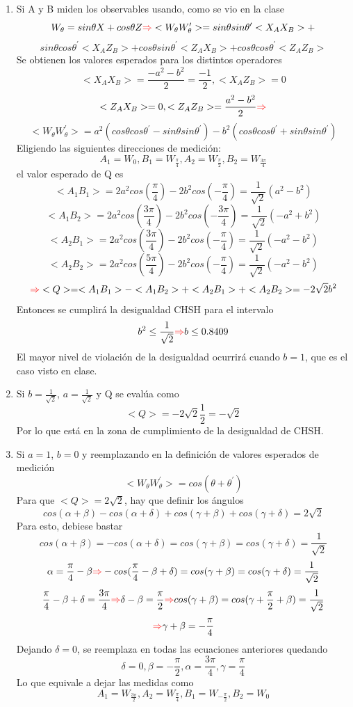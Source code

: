 \documentclass{book}
\begin{document}
\begin{enumerate}
    \item Si A y B miden los observables usando, como se vio en la clase $$ W_\theta=sin \theta X+cos\theta Z \textcolor{red}{\Rightarrow} <W_\theta W_\theta^\prime>= sin\theta sin\theta^\prime<X_AX_B>+$$ $$sin\theta cos\theta^\prime<X_AZ_B>+cos\theta sin\theta^\prime<Z_AX_B>+cos\theta cos\theta^\prime<Z_AZ_B>$$
    Se obtienen los valores esperados para los distintos operadores
    $$ <X_AX_B>=\frac{-a^2-b^2}{2}=\frac{-1}{2}, <X_AZ_B>=0$$
    $$ <Z_AX_B>=0, <Z_AZ_B>=\frac{a^2-b^2}{2}\textcolor{red}{\Rightarrow} $$ $$ <W_\theta W_\theta^\prime>=a^2(cos\theta cos\theta^\prime-sin\theta sin\theta^\prime)-b^2(cos\theta cos\theta^\prime+sin\theta sin\theta^\prime)$$ 
    $$ $$
    Eligiendo las siguientes direcciones de medición:
    $$ A_1=W_0, B_1=W_{\frac{\pi}{4}}, A_2=W_{\frac{\pi}{2}}, B_2=W_{\frac{3\pi}{4}}$$ el valor esperado de Q es 
    $$<A_1 B_1>=2a^2cos(\frac{\pi}{4})-2b^2cos(-\frac{\pi}{4})=\frac{1}{\sqrt{2}}(a^2-b^2)$$ 
    $$<A_1 B_2>=2a^2cos(\frac{3\pi}{4})-2b^2cos(-\frac{3\pi}{4})=\frac{1}{\sqrt{2}}(-a^2+b^2)$$ 
    $$<A_2 B_1>=2a^2 cos(\frac{3\pi}{4})-2b^2cos(-\frac{\pi}{4})=\frac{1}{\sqrt{2}}(-a^2-b^2)$$ 
    $$<A_2 B_2>=2a^2cos(\frac{5\pi}{4})-2b^2cos(-\frac{\pi}{4})=\frac{1}{\sqrt{2}}(-a^2-b^2)$$
    $$\textcolor{red}{\Rightarrow} <Q>=<A_1B_1>-<A_1B_2>+<A_2B_1>+<A_2B_2>=-2\sqrt{2}b^2$$ Entonces se cumplirá la desigualdad CHSH para el intervalo
    $$ b^2\leq \frac{1}{\sqrt{2}} \textcolor{red}{\Rightarrow} b\leq 0.8409$$
    El mayor nivel de violación de la desigualdad ocurrirá cuando $b=1$, que es el caso visto en clase.
    \item Si $b=\frac{1}{\sqrt{2}}$, $a=\frac{1}{\sqrt{2}}$ y Q se evalúa como
    $$ <Q>=-2\sqrt{2}\frac{1}{2}=-\sqrt{2}$$ 
    Por lo que está en la zona de cumplimiento de la desigualdad de CHSH.
    \item Si $a=1$, $b=0$ y reemplazando en la definición de valores esperados de medición
    $$ <W_\theta W_\theta^\prime>=cos(\theta+\theta^{\prime}) $$
    Para que $<Q>=2\sqrt{2}$, hay que definir los ángulos
    $$cos(\alpha+\beta)-cos(\alpha+\delta)+cos(\gamma+\beta)+cos(\gamma+\delta)=2\sqrt{2}$$ Para esto, debiese bastar
    $$ cos(\alpha+\beta)=-cos(\alpha+\delta)=cos(\gamma+\beta)=cos(\gamma+\delta)=\frac{1}{\sqrt{2}}$$ 
    $$ \alpha=\frac{\pi}{4}-\beta \textcolor{red}{\Rightarrow} -cos(\frac{\pi}{4}-\beta+\delta)=cos(\gamma+\beta)=cos(\gamma+\delta)=\frac{1}{\sqrt{2}}$$
    $$ \frac{\pi}{4}-\beta+\delta=\frac{3\pi}{4}\textcolor{red}{\Rightarrow} \delta-\beta=\frac{\pi}{2}\textcolor{red}{\Rightarrow} cos(\gamma+\beta)=cos(\gamma+\frac{\pi}{2}+\beta)=\frac{1}{\sqrt{2}}$$
    $$ \textcolor{red}{\Rightarrow} \gamma+\beta=-\frac{\pi}{4}$$
    Dejando $\delta=0$, se reemplaza en todas las ecuaciones anteriores quedando $$ \delta=0, \beta=-\frac{\pi}{2}, \alpha=\frac{3\pi}{4}, \gamma=\frac{\pi}{4}$$
    Lo que equivale a dejar las medidas como
    $$A_1=W_{\frac{3\pi}{2}}, A_2=W_{\frac{\pi}{4}}, B_1=W_{-\frac{\pi}{2}}, B_2=W_{0}$$
    \end{enumerate}
\end{document}
